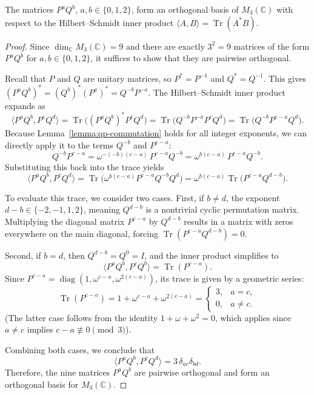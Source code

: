 \begin{lemma}
    \label{lemma:pq-orthogonal}
    The matrices \( P^aQ^b \), \( a,b \in \{0,1,2\} \), form an
    orthogonal basis of \( M_{3}(\mathbb{C}) \) with respect to the
    Hilbert--Schmidt inner product \( \langle A,B \rangle =
    \operatorname{Tr}(A^*B) \).
\end{lemma}

\begin{proof}
    Since \( \dim_{\mathbb{C}} M_{3}(\mathbb{C}) = 9 \) and there are
    exactly \( 3^2 = 9 \) matrices of the form \( P^aQ^b \) for \(
    a,b \in \{0,1,2\} \), it suffices to show that they are pairwise orthogonal.

    Recall that \( P \) and \( Q \) are unitary matrices, so \( P^* =
    P^{-1} \) and \( Q^* = Q^{-1} \). This gives \( (P^aQ^b)^* =
    (Q^b)^*(P^a)^* = Q^{-b}P^{-a} \). The Hilbert--Schmidt inner
    product expands as
    \[
        \langle P^aQ^b, P^cQ^d \rangle
        = \operatorname{Tr}\big((P^aQ^b)^*P^cQ^d\big)
        = \operatorname{Tr}\big(Q^{-b}P^{-a}P^cQ^d\big)
        = \operatorname{Tr}\big(Q^{-b}P^{c-a}Q^d\big).
    \]
    Because Lemma~\ref{lemma:qp-commutation} holds for all integer
    exponents, we can directly apply it to the terms \( Q^{-b} \) and
    \( P^{c-a} \):
    \[
        Q^{-b}P^{c-a} = \omega^{-(-b)(c-a)}\, P^{c-a}Q^{-b} =
        \omega^{b(c-a)}\, P^{c-a}Q^{-b}.
    \]
    Substituting this back into the trace yields
    \[
        \langle P^aQ^b, P^cQ^d \rangle
        = \operatorname{Tr}\big(\omega^{b(c-a)} P^{c-a}Q^{-b}Q^d\big)
        = \omega^{b(c-a)} \operatorname{Tr}\big(P^{c-a}Q^{d-b}\big).
    \]

    To evaluate this trace, we consider two cases. First, if \( b
    \neq d \), the exponent \( d-b \in \{-2,-1,1,2\} \), meaning \(
    Q^{d-b} \) is a nontrivial cyclic permutation matrix. Multiplying
    the diagonal matrix \( P^{c-a} \) by \( Q^{d-b} \) results in a
    matrix with zeros everywhere on the main diagonal, forcing \(
    \operatorname{Tr}(P^{c-a}Q^{d-b}) = 0 \).

    Second, if \( b = d \), then \( Q^{d-b} = Q^0 = I \), and the
    inner product simplifies to
    \[
        \langle P^aQ^b, P^cQ^b \rangle = \operatorname{Tr}(P^{c-a}).
    \]
    Since \( P^{c-a} = \operatorname{diag}(1, \omega^{c-a},
    \omega^{2(c-a)}) \), its trace is given by a geometric series:
    \[
        \operatorname{Tr}(P^{c-a}) = 1 + \omega^{c-a} + \omega^{2(c-a)}
        =
        \begin{cases}
            3, & a = c, \\
            0, & a \neq c.
        \end{cases}
    \]
    (The latter case follows from the identity \( 1 + \omega +
        \omega^2 = 0 \), which applies since \( a \neq c \) implies \(
    c-a \not\equiv 0 \pmod 3 \)).

    Combining both cases, we conclude that
    \[
        \langle P^aQ^b, P^cQ^d \rangle = 3\,\delta_{ac}\delta_{bd}.
    \]
    Therefore, the nine matrices \( P^aQ^b \) are pairwise orthogonal
    and form an orthogonal basis for \( M_{3}(\mathbb{C}) \).
\end{proof}

